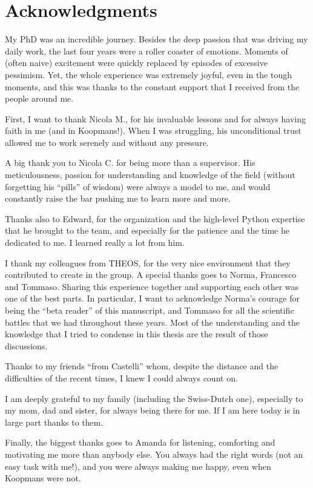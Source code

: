 
\chapter*{Acknowledgments}
\vspace{1.7cm}
%
My PhD was an incredible journey. Besides the deep passion that was driving my daily work, the last four years were a roller coaster of emotions. Moments of (often naive) excitement were quickly replaced by episodes of excessive pessimism. Yet, the whole experience was extremely joyful, even in the tough moments, and this was thanks to the constant support that I received from the people around me.

First, I want to thank Nicola M., for his invaluable lessons and for always having faith in me (and in Koopmans!). When I was struggling, his unconditional trust allowed me to work serenely and without any pressure.

A big thank you to Nicola C. for being more than a supervisor. His meticulousness, passion for understanding and knowledge of the field (without forgetting his ``pills'' of wisdom) were always a model to me, and would constantly raise the bar pushing me to learn more and more.

Thanks also to Edward, for the organization and the high-level Python expertise that he brought to the team, and especially for the patience and the time he dedicated to me. I learned really a lot from him.

I thank my colleagues from THEOS, for the very nice environment that they contributed to create in the group. A special thanks goes to Norma, Francesco and Tommaso. Sharing this experience together and supporting each other was one of the best parts. In particular, I want to acknowledge Norma's courage for being the ``beta reader'' of this manuscript, and Tommaso for all the scientific battles that we had throughout these years. Most of the understanding and the knowledge that I tried to condense in this thesis are the result of those discussions.

Thanks to my friends ``from Castelli'' whom, despite the distance and the difficulties of the recent times, I knew I could always count on.

I am deeply grateful to my family (including the Swiss-Dutch one), especially to my mom, dad and sister, for always being there for me. If I am here today is in large part thanks to them.

Finally, the biggest thanks goes to Amanda for listening, comforting and motivating me more than anybody else. You always had the right words (not an easy task with me!), and you were always making me happy, even when Koopmans were not.
